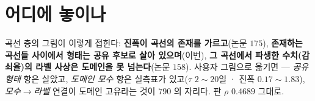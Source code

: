\documentclass[10pt,a4paper]{article}
\begin{document}
\section{어디에 놓이나}

곡선 층의 그림이 이렇게 접힌다: \textbf{진폭이 곡선의 존재를 가르고}(논문
$175$), \textbf{존재하는 곡선들 사이에서 형태는 공유 후보로 살아 있으며}(이번),
\textbf{그 곡선에서 파생한 수치(감쇠율)의 라벨 사상은 도메인을 못 넘는다}(논문
$158$). 사용자 그림으로 옮기면 --- \emph{공유 형태} 항은 살았고, \emph{도메인
모수} 항은 실측표가 있고($\tau$ $2{\sim}20$일 · 진폭 $0.17{\sim}1.83$),
\emph{모수$\to$라벨} 연결이 도메인 고유라는 것이 $790$ 의 자리다. 판 $\rho$
$0.4689$ 그대로.
\end{document}

